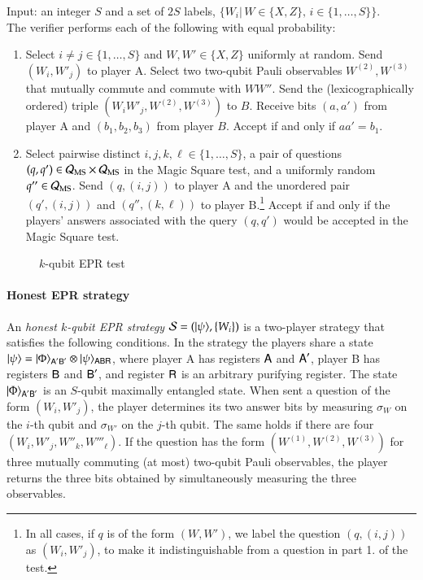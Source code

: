 \vspace{10pt}
\begin{center}
\begin{mdframed}
    Input: an integer $S$ and a set of $2S$ labels, $\{W_i|\, W\in\{X,Z\},\,i\in\{1,\ldots,S\}\}$.\\
		The verifier performs each of the following with equal probability:
		\begin{enumerate}
		\item Select $i\neq j\in\{1,\ldots,S\}$ and $W,W'\in\{X,Z\}$ uniformly at random. Send $(W_i,W'_j)$ to player A. Select two two-qubit Pauli observables $W^{(2)},W^{(3)}$ that mutually commute and commute with $WW''$. Send the (lexicographically ordered) triple $(W_iW'_j,W^{(2)},W^{(3)})$ to $B$. Receive bits $(a,a')$ from player A and $(b_1,b_2,b_3)$ from player $B$. Accept if and only if $aa'=b_1$.
		\item Select pairwise distinct $i,j,k,\ell\in\{1,\ldots,S\}$, a pair of questions $(q,q') \in \mathcal{Q}_{\textsc{MS}}\times\mathcal{Q}_{\textsc{MS}}$ in the Magic Square test, and a uniformly random $q''\in\mathcal{Q}_{\textsc{MS}}$. Send $(q,(i,j))$ to player A and the unordered pair $(q',(i,j))$ and $(q'',(k,\ell))$ to player B.\footnote{In all cases, if $q$ is of the form $(W,W')$, we label the question $(q,(i,j))$ as $(W_i,W'_j)$, to make it indistinguishable from a question in part 1. of the test.} Accept if and only if the players' answers associated with the query $(q,q')$ would be accepted in the Magic Square test. 
   \end{enumerate}    
\end{mdframed}
\end{center}
\begin{figure}[H]
\caption{$k$-qubit EPR test~\cite{chao2016test}}
\label{fig:epr_test}
\end{figure}

\paragraph{Honest EPR strategy} An \emph{honest $k$-qubit EPR strategy} $\mathcal{S} = (|\psi\rangle, \{W_i\})$ is a two-player strategy that satisfies the following conditions. In the strategy the players share a state $|\psi\rangle = |\Phi\rangle_{{\textsf{A}}'{\textsf{B}}'} \otimes |\psi\rangle_{{\textsf{ABR}}}$, where player A has registers ${\textsf{A}}$ and ${\textsf{A}}'$, player B has registers ${\textsf{B}}$ and ${\textsf{B}}'$, and register ${\textsf{R}}$ is an arbitrary purifying register. The state $|\Phi\rangle_{{\textsf{A}}'{\textsf{B}}'}$ is an $S$-qubit maximally entangled state. When sent a question of the form $(W_i,W'_j)$, the player determines its two answer bits by measuring $\sigma_W$ on the $i$-th qubit and $\sigma_{W'}$ on the $j$-th qubit. The same holds if there are four $(W_i,W'_j,W''_k,W'''_\ell)$. If the question has the form $(W^{(1)},W^{(2)},W^{(3)})$ for three mutually commuting (at most) two-qubit Pauli observables, the player returns the three bits obtained by simultaneously  measuring the three observables. 


